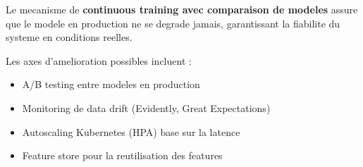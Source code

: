 \documentclass[a4paper,11pt]{article}
\begin{document}
Le mecanisme de \textbf{continuous training avec comparaison de modeles} assure
que le modele en production ne se degrade jamais, garantissant la fiabilite du
systeme en conditions reelles.

Les axes d'amelioration possibles incluent :
\begin{itemize}
    \item A/B testing entre modeles en production
    \item Monitoring de data drift (Evidently, Great Expectations)
    \item Autoscaling Kubernetes (HPA) base sur la latence
    \item Feature store pour la reutilisation des features
\end{itemize}
\end{document}
